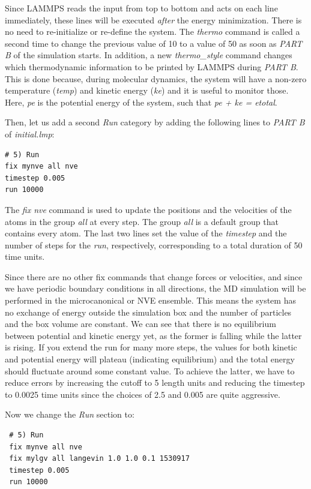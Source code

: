 \documentclass[9pt,tutorial]{livecoms}
\begin{document}
Since LAMMPS reads the input from top to bottom and acts on each line
immediately, these lines will be executed \emph{after} the energy
minimization.  There is no need to re-initialize or re-define the
system.  The \textit{thermo} command is called a second time to change
the previous value of 10 to a value of 50 as soon as \textit{PART B} of
the simulation starts.  In addition, a new \textit{thermo\_style}
command changes which thermodynamic information to be printed by LAMMPS
during \textit{PART B}.  This is done because, during molecular
dynamics, the system will have a non-zero temperature (\textit{temp})
and kinetic energy (\textit{ke}) and it is useful to monitor those.
Here, \textit{pe} is the potential energy of the system, such that
\textit{pe + ke = etotal}.

Then, let us add a second \textit{Run} category by adding the following
lines to \textit{PART B} of \textit{initial.lmp}:
{\normalsize
\begin{verbatim}
# 5) Run
fix mynve all nve
timestep 0.005
run 10000
\end{verbatim}
}
The \textit{fix nve} command is used to update the positions and the
velocities of the atoms in the group \textit{all} at every step.  The
group \textit{all} is a default group that contains every atom.  The
last two lines set the value of the \textit{timestep} and the number of
steps for the \textit{run}, respectively, corresponding to a total
duration of 50 time units.

Since there are no other fix commands that change forces or velocities,
and since we have periodic boundary conditions in all directions, the MD
simulation will be performed in the microcanonical or NVE ensemble.
This means the system has no exchange of energy outside the simulation
box and the number of particles and the box volume are constant.  We can
see that there is no equilibrium between potential and kinetic energy
yet, as the former is falling while the latter is rising.  If you extend
the run for many more steps, the values for both kinetic and
potential energy will plateau (indicating equilibrium) and the total
energy should fluctuate around some constant value.  To achieve the
latter, we have to reduce errors by increasing the cutoff to 5 length
units and reducing the timestep to 0.0025 time units since the choices
of 2.5 and 0.005 are quite aggressive.

Now we change the \textit{Run} section to:
{\normalsize
\begin{verbatim}
 # 5) Run
 fix mynve all nve
 fix mylgv all langevin 1.0 1.0 0.1 1530917
 timestep 0.005
 run 10000
\end{verbatim}
}
\end{document}
